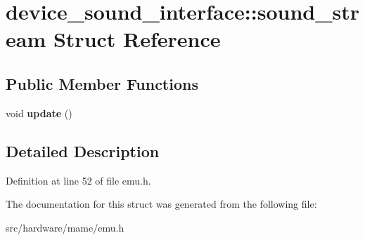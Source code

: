 \hypertarget{structdevice__sound__interface_1_1sound__stream}{\section{device\-\_\-sound\-\_\-interface\-:\-:sound\-\_\-stream Struct Reference}
\label{structdevice__sound__interface_1_1sound__stream}
}
\subsection*{Public Member Functions}
\begin{DoxyCompactItemize}
\item 
\hypertarget{structdevice__sound__interface_1_1sound__stream_af6c3cd236ad76a9458e21a5c2b579c6e}{void {\bfseries update} ()}\label{structdevice__sound__interface_1_1sound__stream_af6c3cd236ad76a9458e21a5c2b579c6e}

\end{DoxyCompactItemize}


\subsection{Detailed Description}


Definition at line 52 of file emu.\-h.



The documentation for this struct was generated from the following file\-:\begin{DoxyCompactItemize}
\item 
src/hardware/mame/emu.\-h\end{DoxyCompactItemize}
